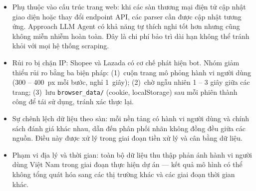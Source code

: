 \begin{itemize}[labelsep=10pt, leftmargin=2cm]
    \item Phụ thuộc vào cấu trúc trang web: khi các sàn thương mại điện tử cập nhật giao diện hoặc thay đổi endpoint API, các parser cần được cập nhật tương ứng. Approach LLM Agent có khả năng tự thích nghi tốt hơn nhưng cũng không miễn nhiễm hoàn toàn. Đây là chi phí bảo trì dài hạn không thể tránh khỏi với mọi hệ thống scraping.
    \item Rủi ro bị chặn IP: Shopee và Lazada có cơ chế phát hiện bot. Nhóm giảm thiểu rủi ro bằng ba biện pháp: (1)~cuộn trang mô phỏng hành vi người dùng (300 -- 400~px mỗi bước, nghỉ 1~giây); (2)~chờ ngẫu nhiên 1 -- 3 giây giữa các trang; (3)~lưu \texttt{browser\_data/} (cookie, localStorage) sau mỗi phiên thành công để tái sử dụng, tránh xác thực lại.
    \item Sự chênh lệch dữ liệu theo sàn: mỗi nền tảng có hành vi người dùng và chính sách đánh giá khác nhau, dẫn đến phân phối nhãn không đồng đều giữa các nguồn. Điều này được xử lý trong giai đoạn tiền xử lý và cân bằng dữ liệu.
    \item Phạm vi địa lý và thời gian: toàn bộ dữ liệu thu thập phản ánh hành vi người dùng Việt Nam trong giai đoạn thực hiện dự án --- kết quả mô hình có thể không tổng quát hóa sang các thị trường khác và các giai đoạn thời gian khác.
\end{itemize}

\clearpage
